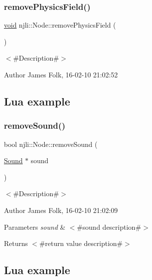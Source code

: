 \subsubsection{\texorpdfstring{remove\+Physics\+Field()}{removePhysicsField()}}
{\footnotesize\ttfamily \mbox{\hyperlink{_thread_8h_af1e856da2e658414cb2456cb6f7ebc66}{void}} njli\+::\+Node\+::remove\+Physics\+Field (\begin{DoxyParamCaption}{ }\end{DoxyParamCaption})}



$<$\#\+Description\#$>$ 

\begin{DoxyAuthor}{Author}
James Folk, 16-\/02-\/10 21\+:02\+:52
\end{DoxyAuthor}
\hypertarget{classnjli_1_1_steering_behavior_wander_ex1}{}\subsection{Lua example}\label{classnjli_1_1_steering_behavior_wander_ex1}

\begin{DoxyCodeInclude}
\end{DoxyCodeInclude}
\mbox{\label{classnjli_1_1_node_ac0a3bb1dd9fb0ccd2f53ff426d4f9309}} 
\subsubsection{\texorpdfstring{remove\+Sound()}{removeSound()}}
{\footnotesize\ttfamily bool njli\+::\+Node\+::remove\+Sound (\begin{DoxyParamCaption}\item[{\mbox{\hyperlink{classnjli_1_1_sound}{Sound}} $\ast$}]{sound }\end{DoxyParamCaption})}



$<$\#\+Description\#$>$ 

\begin{DoxyAuthor}{Author}
James Folk, 16-\/02-\/10 21\+:02\+:09
\end{DoxyAuthor}

\begin{DoxyParams}{Parameters}
{\em sound} & $<$\#sound description\#$>$\\
\hline
\end{DoxyParams}
\begin{DoxyReturn}{Returns}
$<$\#return value description\#$>$
\end{DoxyReturn}
\hypertarget{classnjli_1_1_steering_behavior_wander_ex1}{}\subsection{Lua example}\label{classnjli_1_1_steering_behavior_wander_ex1}

